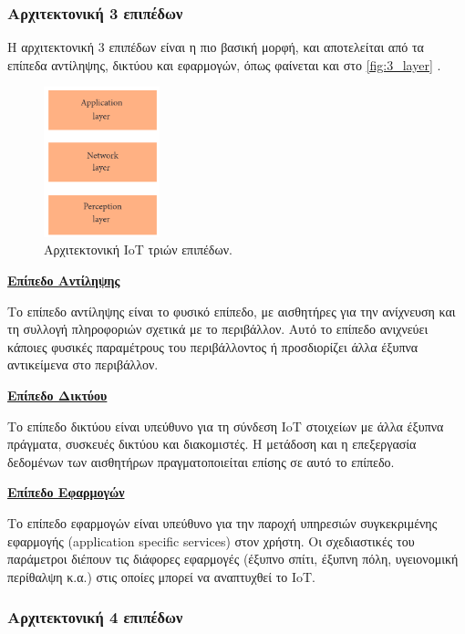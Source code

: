 \subsubsection{Αρχιτεκτονική 3 επιπέδων}
\label{subsubsec:3_layer}

Η αρχιτεκτονική 3 επιπέδων είναι η πιο βασική μορφή, και αποτελείται από τα επίπεδα αντίληψης, δικτύου και εφαρμογών, όπως φαίνεται και στο \autoref{fig:3_layer} \cite{bib:sethi_2017}.

\begin{figure}[!ht]
	\centering
	\includegraphics[width=0.3\textwidth]{./images/chapter2/3_layer.png}
	\caption{Αρχιτεκτονική IoT τριών επιπέδων.}
	\label{fig:3_layer}
\end{figure}

\textbf{\underline{Επίπεδο Αντίληψης}}

Το επίπεδο αντίληψης είναι το φυσικό επίπεδο, με αισθητήρες για την ανίχνευση και τη συλλογή πληροφοριών σχετικά με το περιβάλλον. Αυτό το επίπεδο ανιχνεύει κάποιες φυσικές παραμέτρους του περιβάλλοντος ή προσδιορίζει άλλα έξυπνα αντικείμενα στο περιβάλλον.

\textbf{\underline{Επίπεδο Δικτύου}}

Το επίπεδο δικτύου είναι υπεύθυνο για τη σύνδεση IoT στοιχείων με άλλα έξυπνα πράγματα, συσκευές δικτύου και διακομιστές. Η μετάδοση και η επεξεργασία δεδομένων των αισθητήρων πραγματοποιείται επίσης σε αυτό το επίπεδο.

\textbf{\underline{Επίπεδο Εφαρμογών}}

Το επίπεδο εφαρμογών είναι υπεύθυνο για την παροχή υπηρεσιών συγκεκριμένης εφαρμογής (application specific services) στον χρήστη. Οι σχεδιαστικές του παράμετροι διέπουν τις διάφορες εφαρμογές (έξυπνο σπίτι, έξυπνη πόλη, υγειονομική περίθαλψη κ.α.) στις οποίες μπορεί να αναπτυχθεί το IoT.

\subsubsection{Αρχιτεκτονική 4 επιπέδων}
\label{subsubsec:4_layer}

